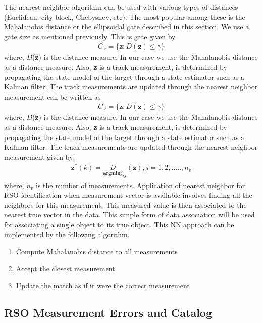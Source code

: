 \documentclass[]{aiaa-tc}%
\begin{document}
The nearest neighbor algorithm can be used with various types of distances (Euclidean, city block, Chebyshev, etc). The most popular among these is the Mahalanobis distance or the ellipsoidal gate described in this section. We use a gate  size as mentioned previously. This is gate given by
\begin{align}
\label{NNEqn}
G_{r} = \lbrace \textbf{z} : D(\textbf{z})\leq\gamma \rbrace
\end{align}
where, $D$(\textbf{z}) is the distance measure. In our case we use the Mahalanobis distance as a distance measure. Also, \textbf{z} is a track measurement, is determined by propagating the state model of the target through a state estimator such as a Kalman filter. The track measurements are updated through the nearest neighbor measurement can be written as
\begin{align}
\label{NNEqn}
G_{r} = \lbrace \textbf{z} : D(\textbf{z})\leq\gamma \rbrace
\end{align}
where, $D$(\textbf{z}) is the distance measure. In our case we use the Mahalanobis distance as a distance measure. Also, \textbf{z} is a track measurement, is determined by propagating the state model of the target through a state estimator such as a Kalman filter. The track measurements are updated through the nearest neighbor measurement given by:\\
\begin{align}
\textbf{z}^{*}(k) = \underset{\textbf{argmin}{j}} D_{ij}(\textbf{z}), j= 1,2,.....,n_{v}
\end{align}
where, $n_v$ is the number of measurements. Application of nearest neighbor for RSO identification when measurement vector is available involves finding all the neighbors for this measurement. This measured value is then associated to the nearest true vector in the data. This simple form of data association will be used for associating a single object to its true object. This NN approach can be implemented by the following algorithm.
  \begin{enumerate}
\item Compute Mahalanobis distance to all measurements
\item Accept the closest measurement
\item Update the match as if it were the correct measurement
\end{enumerate}

\subsection{RSO Measurement Errors and Catalog}
\end{document}
